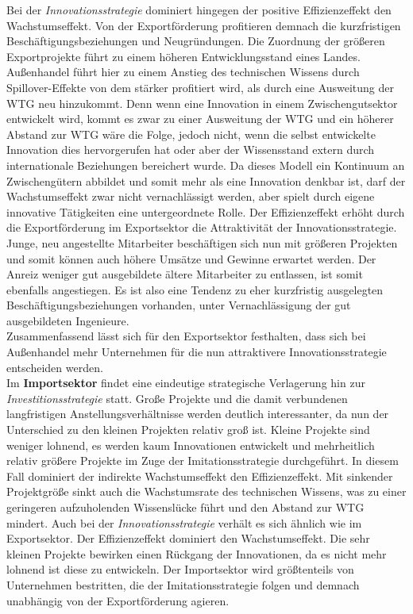 Bei der \textit{Innovationsstrategie} dominiert hingegen der positive Effizienzeffekt den Wachstumseffekt. Von der Exportförderung profitieren demnach die kurzfristigen Beschäftigungsbeziehungen und Neugründungen. Die Zuordnung der grö{\ss}eren Exportprojekte führt zu einem höheren Entwicklungsstand eines Landes. Au{\ss}enhandel führt hier zu einem Anstieg des technischen Wissens durch Spillover-Effekte von dem stärker profitiert wird, als durch eine Ausweitung der WTG neu hinzukommt. Denn wenn eine Innovation in einem Zwischengutsektor entwickelt wird, kommt es zwar zu einer Ausweitung der WTG und ein höherer Abstand zur WTG wäre die Folge, jedoch nicht, wenn die selbst entwickelte Innovation dies hervorgerufen hat oder aber der Wissensstand extern durch internationale Beziehungen bereichert wurde. Da dieses Modell ein Kontinuum an Zwischengütern abbildet und somit mehr als eine Innovation denkbar ist, darf der Wachstumseffekt zwar nicht vernachlässigt werden, aber spielt durch eigene innovative Tätigkeiten eine untergeordnete Rolle. Der Effizienzeffekt erhöht durch die Exportförderung im Exportsektor die Attraktivität der Innovationsstrategie. Junge, neu angestellte Mitarbeiter beschäftigen sich nun mit grö{\ss}eren Projekten und somit können auch höhere Umsätze und Gewinne erwartet werden. Der Anreiz weniger gut ausgebildete ältere Mitarbeiter zu entlassen, ist somit ebenfalls angestiegen. Es ist also eine Tendenz zu eher kurzfristig ausgelegten Beschäftigungsbeziehungen vorhanden, unter Vernachlässigung der gut ausgebildeten Ingenieure.\\


Zusammenfassend lässt sich für den Exportsektor festhalten, dass sich bei Au{\ss}enhandel mehr Unternehmen für die nun attraktivere Innovationsstrategie entscheiden werden.\\


Im \textbf{Importsektor} findet eine eindeutige strategische Verlagerung hin zur \textit{Investitionsstrategie} statt. Gro{\ss}e Projekte und die damit verbundenen langfristigen Anstellungsverhältnisse werden deutlich interessanter, da nun der Unterschied zu den kleinen Projekten relativ gro{\ss} ist. Kleine Projekte sind weniger lohnend, es werden kaum Innovationen entwickelt und mehrheitlich relativ grö{\ss}ere Projekte im Zuge der Imitationsstrategie durchgeführt. In diesem Fall dominiert der indirekte Wachstumseffekt den Effizienzeffekt. Mit sinkender Projektgrö{\ss}e sinkt auch die Wachstumsrate des technischen Wissens, was zu einer geringeren aufzuholenden Wissenslücke führt und den Abstand zur WTG mindert. Auch bei der \textit{Innovationsstrategie} verhält es sich ähnlich wie im Exportsektor. Der Effizienzeffekt dominiert den Wachstumseffekt. Die sehr kleinen Projekte bewirken einen Rückgang der Innovationen, da es nicht mehr lohnend ist diese zu entwickeln. Der Importsektor wird grö{\ss}tenteils von Unternehmen bestritten, die der Imitationsstrategie folgen und demnach unabhängig von der Exportförderung agieren. \\


